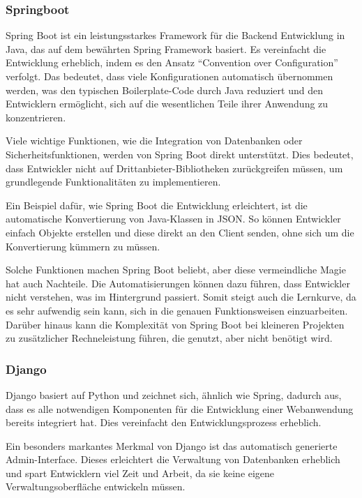 \documentclass[biblatex]{lni}
\begin{document}
\subsubsection{Springboot}

Spring Boot ist ein leistungsstarkes Framework für die Backend Entwicklung in Java,
das auf dem bewährten Spring Framework basiert. \cite{MED}
Es vereinfacht die Entwicklung erheblich, indem es den Ansatz “Convention over Configuration” verfolgt.
Das bedeutet, dass viele Konfigurationen automatisch übernommen werden,
was den typischen Boilerplate-Code durch Java reduziert und den Entwicklern ermöglicht,
sich auf die wesentlichen Teile ihrer Anwendung zu konzentrieren.

Viele wichtige Funktionen, wie die Integration von Datenbanken oder Sicherheitsfunktionen,
werden von Spring Boot direkt unterstützt. \cite{SPR}
Dies bedeutet, dass Entwickler nicht auf Drittanbieter-Bibliotheken zurückgreifen müssen,
um grundlegende Funktionalitäten zu implementieren.

Ein Beispiel dafür, wie Spring Boot die Entwicklung erleichtert, ist die automatische Konvertierung von Java-Klassen in \ac{JSON}.
So können Entwickler einfach Objekte erstellen und diese direkt an den Client senden, ohne sich um die Konvertierung kümmern zu müssen.

Solche Funktionen machen Spring Boot beliebt, aber diese vermeindliche Magie hat auch Nachteile. \cite{EiA}
Die Automatisierungen können dazu führen, dass Entwickler nicht verstehen, was im Hintergrund passiert.
Somit steigt auch die Lernkurve, da es sehr aufwendig sein kann, sich in die genauen Funktionsweisen einzuarbeiten.
Darüber hinaus kann die Komplexität von Spring Boot bei kleineren Projekten zu zusätzlicher Rechneleistung führen, die genutzt, aber nicht benötigt wird.

\subsubsection{Django}

Django basiert auf Python und zeichnet sich, ähnlich wie Spring, dadurch aus,
dass es alle notwendigen Komponenten für die Entwicklung einer Webanwendung bereits integriert hat.
Dies vereinfacht den Entwicklungsprozess erheblich. \cite{MED}

Ein besonders markantes Merkmal von Django ist das automatisch generierte Admin-Interface.
Dieses erleichtert die Verwaltung von Datenbanken erheblich und spart Entwicklern viel Zeit und Arbeit,
da sie keine eigene Verwaltungsoberfläche entwickeln müssen. \cite{DJO}
\end{document}
